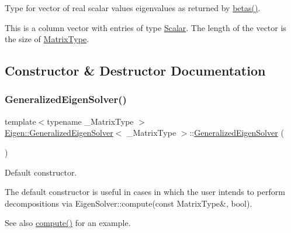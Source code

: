Type for vector of real scalar values eigenvalues as returned by \mbox{\hyperlink{class_eigen_1_1_generalized_eigen_solver_abeaa6f56cee367b83fd09d428462ca0c}{betas()}}. 

This is a column vector with entries of type \mbox{\hyperlink{class_eigen_1_1_generalized_eigen_solver_afb318d0b097ff8dd5a7410d31317ca47}{Scalar}}. The length of the vector is the size of \mbox{\hyperlink{class_eigen_1_1_generalized_eigen_solver_a56f4b9823bb9a267de3aaf48428cd247}{Matrix\+Type}}. 

\subsection{Constructor \& Destructor Documentation}
\mbox{\label{class_eigen_1_1_generalized_eigen_solver_ae745f39da43f9df192cc2875d82b4cf1}} 
\subsubsection{\texorpdfstring{GeneralizedEigenSolver()}{GeneralizedEigenSolver()}\hspace{0.1cm}{\footnotesize\ttfamily [1/3]}}
{\footnotesize\ttfamily template$<$typename \+\_\+\+Matrix\+Type $>$ \\
\mbox{\hyperlink{class_eigen_1_1_generalized_eigen_solver}{Eigen\+::\+Generalized\+Eigen\+Solver}}$<$ \+\_\+\+Matrix\+Type $>$\+::\mbox{\hyperlink{class_eigen_1_1_generalized_eigen_solver}{Generalized\+Eigen\+Solver}} (\begin{DoxyParamCaption}{ }\end{DoxyParamCaption})\hspace{0.3cm}{\ttfamily [inline]}}



Default constructor. 

The default constructor is useful in cases in which the user intends to perform decompositions via Eigen\+Solver\+::compute(const Matrix\+Type\&, bool).

\begin{DoxySeeAlso}{See also}
\mbox{\hyperlink{class_eigen_1_1_generalized_eigen_solver_a275910b47dfe5f40211dcb59cfd68f3c}{compute()}} for an example. 
\end{DoxySeeAlso}
\mbox{\label{class_eigen_1_1_generalized_eigen_solver_aab6423ded30275cd4cdd31758c278694}} 
